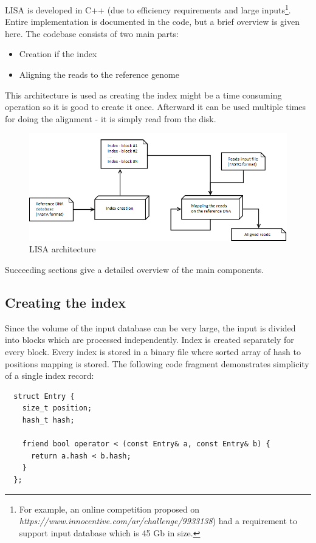 \documentclass[times, utf8, diplomski]{fer}
\begin{document}
LISA is developed in C++ (due to efficiency requirements and large inputs\footnote{For example, an online competition proposed on \emph{https://www.innocentive.com/ar/challenge/9933138}) had a requirement to support input database which is 45 Gb in size.}. Entire implementation is documented in the code, but a brief overview is given here. The codebase consists of two main parts:
\begin{itemize}
\item Creation if the index
\item Aligning the reads to the reference genome
\end{itemize}
This architecture is used as creating the index might be a time consuming operation so it is good to create it once. Afterward it can be used multiple times for doing the alignment - it is simply read from the disk.\\

\begin{figure}[H]
\centering
\includegraphics[width=1.0\textwidth]{../img/components.png}
\caption{LISA architecture}\label{components}
\end{figure}

Succeeding sections give a detailed overview of the main components.

\subsection{Creating the index}
Since the volume of the input database can be very large, the input is divided into blocks which are processed independently. Index is created separately for every block. Every index is stored in a binary file where sorted array of hash to positions mapping is stored. The following code fragment demonstrates simplicity of a single index record:
\begin{lstlisting}
  struct Entry {
    size_t position;
    hash_t hash;

    friend bool operator < (const Entry& a, const Entry& b) {
      return a.hash < b.hash;
    }
  };
\end{lstlisting}
\end{document}
